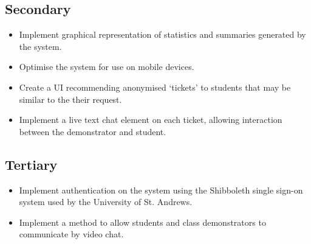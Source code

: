 \subsection{Secondary}
\begin{itemize}
    \item Implement graphical representation of statistics and summaries generated by the system.
    \item Optimise the system for use on mobile devices. 
    \item Create a UI recommending anonymised `tickets' to students that may be similar to the their request.
    \item Implement a live text chat element on each ticket, allowing interaction between the demonstrator and student.
\end{itemize}

\subsection{Tertiary}
\begin{itemize}
    \item Implement authentication on the system using the Shibboleth single sign-on system used by the University of St. Andrews.
    \item Implement a method to allow students and class demonstrators to communicate by video chat. 
\end{itemize}